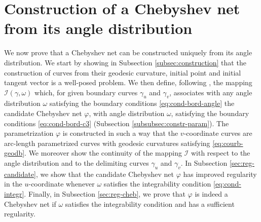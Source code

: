 \documentclass{article}
\newcommand{\I}{\mathcal{I}}
\theoremstyle{remark}
\theoremstyle{prpart}
\begin{document}


































\section{Construction of a Chebyshev net from its angle distribution}\label{subsec:constr-param}
We now prove that a Chebyshev net can be constructed uniquely from its angle distribution. We start by showing in Subsection \ref{subsec:construction} that the construction of curves from their geodesic curvature, initial point and initial tangent vector is a well-posed problem. We then define, following \cite{Ghys09}, the mapping $\I(\gamma,\omega)$ which, for given boundary curves $\gamma_u$ and $\gamma_v$, associates with any angle distribution $\omega$ satisfying the boundary conditions \eqref{eq:cond-bord-angle} the candidate Chebyshev net $\varphi$, with angle distribution $\omega$, satisfying the boundary conditions \eqref{eq:cond-bord-c3} (Subsection \ref{subsubsec:constr-param}). The parametrization $\varphi$ is constructed in such a way that the $v$-coordinate curves are arc-length parametrized curves with geodesic curvatures satisfying \eqref{eq:courb-geodb}. We moreover show the continuity of the mapping $\I$ with respect to the angle distribution and to the delimiting curves $\gamma_u$ and $\gamma_v$. In Subsection \ref{sec:reg-candidate}, we show that the candidate Chebyshev net $\varphi$ has improved regularity in the $u$-coordinate whenever $\omega$ satisfies the integrability condition \eqref{eq:cond-integr}. Finally, in Subsection \ref{sec:reg-cheb}, we prove that $\varphi$ is indeed a Chebyshev net if $\omega$ satisfies the integrability condition and has a sufficient regularity.
\end{document}
